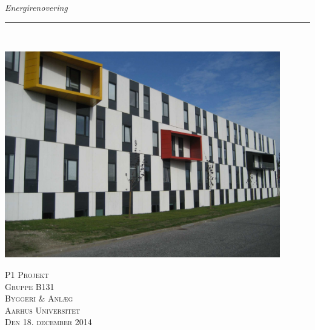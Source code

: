 \thispagestyle{empty}
\begin{flushright}
\vspace{3cm}

\phantom{hul}

\phantom{hul}

\phantom{hul}

\textsl{\Huge Energirenovering} \\ \vspace{1cm}

\rule{13cm}{3mm} \\ \vspace{1.5cm}
\vspace{1cm}

\includegraphics[width=0.9\textwidth]{billeder/forside.jpg}

\vspace{2cm} 
\textsc{\Large P1 Projekt \\
Gruppe B131 \\
Byggeri \& Anlæg \\
Aarhus Universitet \\
Den 18. december 2014 \\}
\end{flushright}
